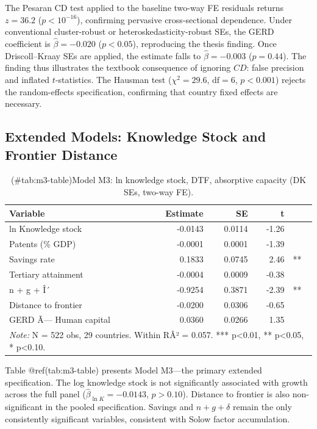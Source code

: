 \documentclass[
  11pt,
]{article}
\begin{document}
The Pesaran CD test applied to the baseline two-way FE residuals returns \(z = 36.2\) (\(p < 10^{-16}\)), confirming pervasive cross-sectional dependence. Under conventional cluster-robust or heteroskedasticity-robust SEs, the GERD coefficient is \(\hat\beta = -0.020\) (\(p < 0.05\)), reproducing the thesis finding. Once Driscoll--Kraay SEs are applied, the estimate falls to \(\hat\beta = -0.003\) (\(p = 0.44\)). The finding thus illustrates the textbook consequence of ignoring \(CD\): false precision and inflated \(t\)-statistics. The Hausman test (\(\chi^2 = 29.6\), \(\text{df} = 6\), \(p < 0.001\)) rejects the random-effects specification, confirming that country fixed effects are necessary.

\hypertarget{extended-models-knowledge-stock-and-frontier-distance}{%
\subsection{Extended Models: Knowledge Stock and Frontier Distance}\label{extended-models-knowledge-stock-and-frontier-distance}}

\begin{table}[!h]
\centering
\caption{(\#tab:m3-table)Model M3: ln knowledge stock, DTF, absorptive capacity (DK SEs, two-way FE).}
\centering
\begin{tabular}[t]{lrrrl}
\toprule
Variable & Estimate & SE & t & \\
\midrule
ln Knowledge stock & -0.0143 & 0.0114 & -1.26 & \\
Patents (\% GDP) & -0.0001 & 0.0001 & -1.39 & \\
Savings rate & 0.1833 & 0.0745 & 2.46 & **\\
Tertiary attainment & -0.0004 & 0.0009 & -0.38 & \\
n + g + Î´ & -0.9254 & 0.3871 & -2.39 & **\\
Distance to frontier & -0.0200 & 0.0306 & -0.65 & \\
GERD Ã— Human capital & 0.0360 & 0.0266 & 1.35 & \\
\bottomrule
\multicolumn{5}{l}{\rule{0pt}{1em}\textit{Note:} N = 522 obs, 29 countries. Within RÂ² = 0.057. *** p<0.01, ** p<0.05, * p<0.10.}\\
\end{tabular}
\end{table}

Table @ref(tab:m3-table) presents Model M3---the primary extended specification. The log knowledge stock is not significantly associated with growth across the full panel (\(\hat\beta_{\ln K} = -0.0143\), \(p > 0.10\)). Distance to frontier is also non-significant in the pooled specification. Savings and \(n + g + \delta\) remain the only consistently significant variables, consistent with Solow factor accumulation.
\end{document}

